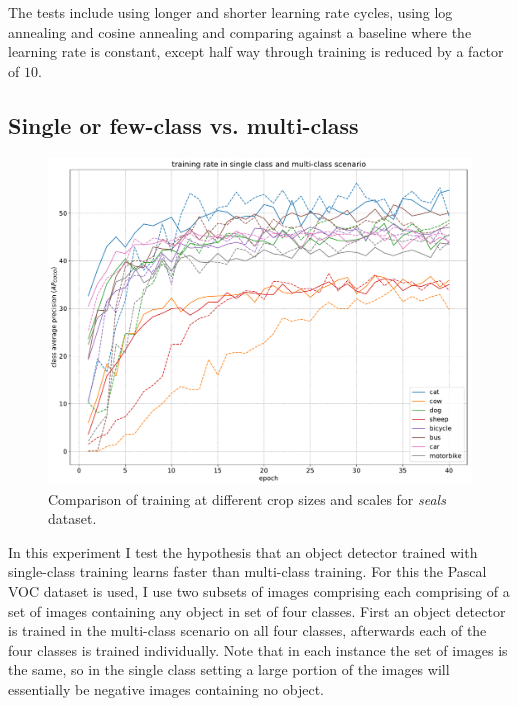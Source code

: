 The tests include using longer and shorter learning rate cycles, using log annealing and cosine annealing and comparing against a baseline where the learning rate is constant, except half way through training is reduced by a factor of $10$.






\subsection{Single or few-class vs. multi-class}
\label{sec:multiclass}

\begin{figure}[h]
  \centering
  \includegraphics[width=1.0\linewidth]{charts/training/multiclass.pdf}
  \caption{Comparison of training at different crop sizes and scales for \emph{seals} dataset. }  
  \label{fig:multiclass}
\end{figure}

In this experiment I test the hypothesis that an object detector trained with single-class training learns faster than multi-class training. For this the Pascal VOC dataset is used, I use two subsets of images comprising each comprising of a set of images containing any object in set of four classes. First an object detector is trained in the multi-class scenario on all four classes, afterwards each of the four classes is trained individually. Note that in each instance the set of images is the same, so in the single class setting a large portion of the images will essentially be negative images containing no object.

